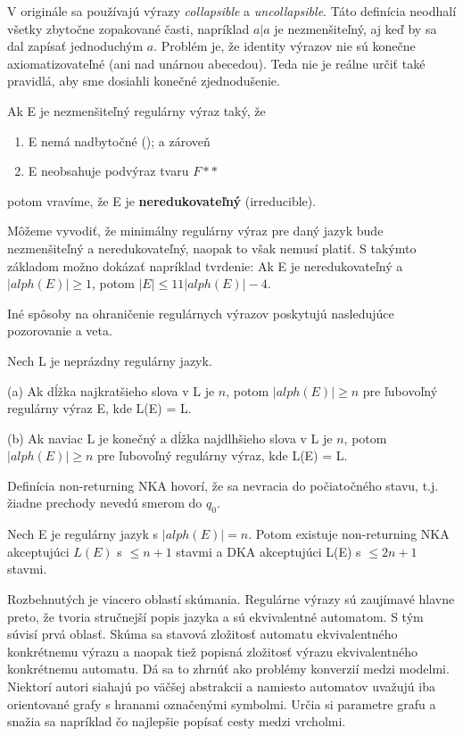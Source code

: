 V originále sa používajú výrazy \textit{collapsible} a \textit{uncollapsible}. Táto definícia neodhalí všetky zbytočne zopakované časti, napríklad $a|a$ je nezmenšiteľný, aj keď by sa dal zapísať jednoduchým $a$. Problém je, že identity výrazov nie sú konečne axiomatizovateľné (ani nad unárnou abecedou). Teda nie je reálne určiť také pravidlá, aby sme dosiahli konečné zjednodušenie. \cite{newResults}

\begin{df}
Ak E je nezmenšiteľný regulárny výraz taký, že
\begin{enumerate}
\item E nemá nadbytočné (); a zároveň
\item E neobsahuje podvýraz tvaru $F**$
\end{enumerate}
potom vravíme, že E je \textbf{neredukovateľný} (irreducible).
\end{df}

Môžeme vyvodiť, že minimálny regulárny výraz pre daný jazyk bude nezmenšiteľný a neredukovateľný, naopak to však nemusí platiť. S takýmto základom možno dokázať napríklad tvrdenie: Ak E je neredukovateľný a $|alph(E)| \geq 1$, potom $|E| \leq 11|alph(E)| - 4$.

Iné spôsoby na ohraničenie regulárnych výrazov poskytujú nasledujúce pozorovanie a veta.

\begin{veta}
Nech L je neprázdny regulárny jazyk.

(a) Ak dĺžka najkratšieho slova v L je $n$, potom $|alph(E)| \geq n$ pre ľubovoľný regulárny výraz E, kde L(E) = L.

(b) Ak naviac L je konečný a dĺžka najdlhšieho slova v L je $n$, potom $|alph(E)| \geq n$ pre ľubovoľný regulárny výraz, kde L(E) = L.
\end{veta}

Definícia non-returning NKA hovorí, že sa nevracia do počiatočného stavu, t.j. žiadne prechody nevedú smerom do $q_0$.

\begin{veta}[Theorem 10]
Nech E je regulárny jazyk s $|alph(E)| = n$. Potom existuje non-returning NKA akceptujúci $L(E)$ s $\leq n+1$ stavmi a DKA akceptujúci L(E) s $\leq 2n+1$ stavmi.
\end{veta}

Rozbehnutých je viacero oblastí skúmania. Regulárne výrazy sú zaujímavé hlavne preto, že tvoria stručnejší popis jazyka a sú ekvivalentné automatom. S tým súvisí prvá oblasť. Skúma sa stavová zložitosť automatu ekvivalentného konkrétnemu výrazu a naopak tiež popisná zložitosť výrazu ekvivalentného konkrétnemu automatu. Dá sa to zhrnúť ako problémy konverzií medzi modelmi. Niektorí autori siahajú po väčšej abstrakcii a namiesto automatov uvažujú iba orientované grafy s hranami označenými symbolmi. Určia si parametre grafu a snažia sa napríklad čo najlepšie popísať cesty medzi vrcholmi.


